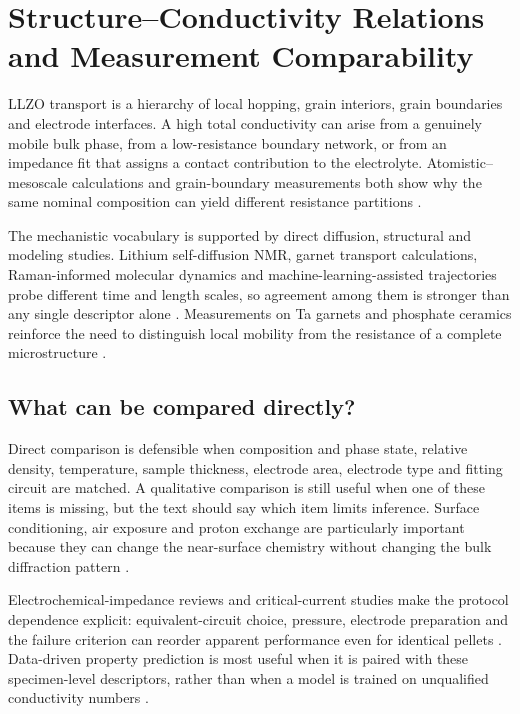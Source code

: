 \section{Structure--Conductivity Relations and Measurement Comparability}
\label{sec:transport}

LLZO transport is a hierarchy of local hopping, grain interiors, grain boundaries and electrode interfaces. A high total conductivity can arise from a genuinely mobile bulk phase, from a low-resistance boundary network, or from an impedance fit that assigns a contact contribution to the electrolyte. Atomistic--mesoscale calculations and grain-boundary measurements both show why the same nominal composition can yield different resistance partitions \cite{heo2021microstructural,gao2021revealing,kulkarni2025machine}.

The mechanistic vocabulary is supported by direct diffusion, structural and modeling studies. Lithium self-diffusion NMR, garnet transport calculations, Raman-informed molecular dynamics and machine-learning-assisted trajectories probe different time and length scales, so agreement among them is stronger than any single descriptor alone \cite{kuhn2011li,kozinsky2015effects,wang2015design,miyagawa2026raman,burov2026machine,jin2023garnet}. Measurements on Ta garnets and phosphate ceramics reinforce the need to distinguish local mobility from the resistance of a complete microstructure \cite{ahmad2015concentration,mariappan2011correlation,aono1993the}.

\subsection{What can be compared directly?}

Direct comparison is defensible when composition and phase state, relative density, temperature, sample thickness, electrode area, electrode type and fitting circuit are matched. A qualitative comparison is still useful when one of these items is missing, but the text should say which item limits inference. Surface conditioning, air exposure and proton exchange are particularly important because they can change the near-surface chemistry without changing the bulk diffraction pattern \cite{grissa2020impact,rosen2021controlling,uhlenbruck2018reactions}.

Electrochemical-impedance reviews and critical-current studies make the protocol dependence explicit: equivalent-circuit choice, pressure, electrode preparation and the failure criterion can reorder apparent performance even for identical pellets \cite{vadhva2021electrochemical,lu2021critical,klimpel2023standardizing,sarkar2022critical}. Data-driven property prediction is most useful when it is paired with these specimen-level descriptors, rather than when a model is trained on unqualified conductivity numbers \cite{li2024machine,yang2022ionic,xie2024high,bai2025understanding}.

